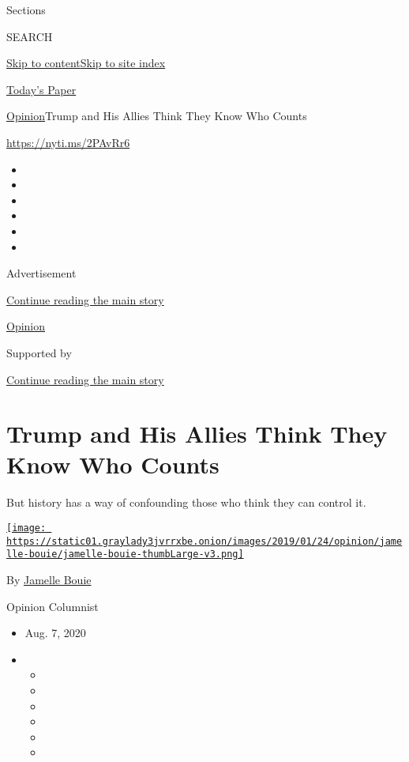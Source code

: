 Sections

SEARCH

\protect\hyperlink{site-content}{Skip to
content}\protect\hyperlink{site-index}{Skip to site index}

\href{https://myaccount.nytimes3xbfgragh.onion/auth/login?response_type=cookie\&client_id=vi}{}

\href{https://www.nytimes3xbfgragh.onion/section/todayspaper}{Today's
Paper}

\href{/section/opinion}{Opinion}\textbar{}Trump and His Allies Think
They Know Who Counts

\url{https://nyti.ms/2PAvRr6}

\begin{itemize}
\item
\item
\item
\item
\item
\item
\end{itemize}

Advertisement

\protect\hyperlink{after-top}{Continue reading the main story}

\href{/section/opinion}{Opinion}

Supported by

\protect\hyperlink{after-sponsor}{Continue reading the main story}

\hypertarget{trump-and-his-allies-think-they-know-who-counts}{%
\section{Trump and His Allies Think They Know Who
Counts}\label{trump-and-his-allies-think-they-know-who-counts}}

But history has a way of confounding those who think they can control
it.

\href{https://www.nytimes3xbfgragh.onion/column/jamelle-bouie}{\texttt{[image: https://static01.graylady3jvrrxbe.onion/images/2019/01/24/opinion/jamelle-bouie/jamelle-bouie-thumbLarge-v3.png]}}

By
\href{https://www.nytimes3xbfgragh.onion/column/jamelle-bouie}{Jamelle
Bouie}

Opinion Columnist

\begin{itemize}
\item
  Aug. 7, 2020
\item
  \begin{itemize}
  \item
  \item
  \item
  \item
  \item
  \item
  \end{itemize}
\end{itemize}


